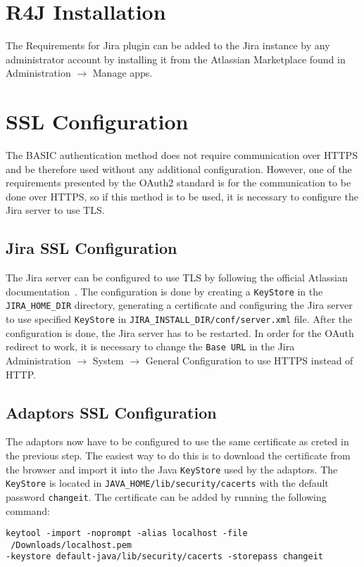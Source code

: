 \section{R4J Installation}
The Requirements for Jira plugin can be added to the Jira instance by any administrator account by installing it from the Atlassian Marketplace found in Administration $\rightarrow$ Manage apps.

\section{SSL Configuration}
The BASIC authentication method does not require communication over HTTPS and be therefore used without any additional configuration. However, one of the requirements presented by the OAuth2 standard is for the communication to be done over HTTPS, so if this method is to be used, it is necessary to configure the Jira server to use TLS.

\subsection*{Jira SSL Configuration}
The Jira server can be configured to use TLS by following the official Atlassian documentation \cite{jira_ssl_tutorial}. The configuration is done by creating a \texttt{KeyStore} in the \texttt{JIRA\_HOME\_DIR} directory, generating a certificate and configuring the Jira server to use specified \texttt{KeyStore} in \texttt{JIRA\_INSTALL\_DIR/conf/server.xml} file. After the configuration is done, the Jira server has to be restarted. In order for the OAuth redirect to work, it is necessary to change the \texttt{Base URL} in the Jira Administration $\rightarrow$ System $\rightarrow$ General Configuration to use HTTPS instead of HTTP.

\subsection*{Adaptors SSL Configuration}
The adaptors now have to be configured to use the same certificate as creted in the previous step. The easiest way to do this is to download the certificate from the browser and import it into the Java \texttt{KeyStore} used by the adaptors. The \texttt{KeyStore} is located in \texttt{JAVA\_HOME/lib/security/cacerts} with the default password \texttt{changeit}. The certificate can be added by running the following command: 

\noindent\texttt{keytool -import -noprompt -alias localhost -file ~/Downloads/localhost.pem \\-keystore default-java/lib/security/cacerts -storepass changeit}

